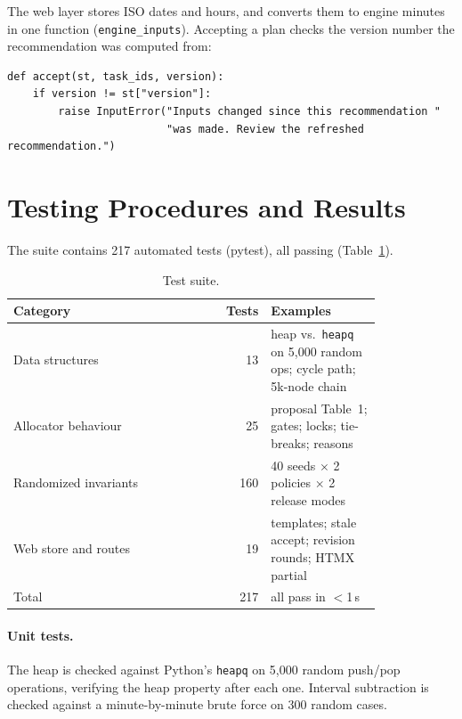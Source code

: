 \documentclass[sigconf,nonacm]{acmart}
\begin{document}
The web layer stores ISO dates and hours, and converts them to engine minutes in one
function (\texttt{engine\_inputs}). Accepting a plan checks the version number the
recommendation was computed from:

\begin{lstlisting}
def accept(st, task_ids, version):
    if version != st["version"]:
        raise InputError("Inputs changed since this recommendation "
                         "was made. Review the refreshed recommendation.")
\end{lstlisting}

\section{Testing Procedures and Results}
The suite contains 217 automated tests (pytest), all passing (Table~\ref{tab:tests}).

\begin{table}[t]
\centering
\caption{Test suite.}
\label{tab:tests}
\small
\begin{tabular}{@{}p{0.52\linewidth}rp{0.3\linewidth}@{}}
\toprule
\textbf{Category} & \textbf{Tests} & \textbf{Examples} \\
\midrule
Data structures & 13 & heap vs.\ \texttt{heapq} on 5{,}000 random ops; cycle path; 5k-node chain \\
Allocator behaviour & 25 & proposal Table~1; gates; locks; tie-breaks; reasons \\
Randomized invariants & 160 & 40 seeds $\times$ 2 policies $\times$ 2 release modes \\
Web store and routes & 19 & templates; stale accept; revision rounds; HTMX partial \\
\midrule
Total & 217 & all pass in $<$1\,s \\
\bottomrule
\end{tabular}
\end{table}

\paragraph{Unit tests.} The heap is checked against Python's \texttt{heapq} on 5{,}000
random push/pop operations, verifying the heap property after each one. Interval subtraction
is checked against a minute-by-minute brute force on 300 random cases.
\end{document}
